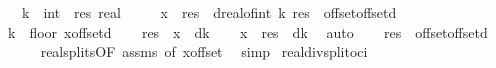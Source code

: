 \begin{isabellebody}
\ \ \ k\ {\isacharcolon}{\kern0pt}{\isacharcolon}{\kern0pt}\ int\ \ res\ {\isacharcolon}{\kern0pt}{\isacharcolon}{\kern0pt}real\ \isanewline
\ \ \ \ {\isachardoublequoteopen}x\ {\isacharequal}{\kern0pt}\ res\ {\isacharplus}{\kern0pt}\ d{\isacharasterisk}{\kern0pt}real{\isacharunderscore}{\kern0pt}of{\isacharunderscore}{\kern0pt}int\ k{\isachardoublequoteclose}\ {\isachardoublequoteopen}res\ {\isasymin}\ {\isacharbraceleft}{\kern0pt}offset{\isachardot}{\kern0pt}{\isachardot}{\kern0pt}{\isacharless}{\kern0pt}offset{\isacharplus}{\kern0pt}d{\isacharbraceright}{\kern0pt}{\isachardoublequoteclose}\isanewline
%
\isadelimproof
%
\endisadelimproof
%
\isatagproof
{}\isamarkupfalse%
\isanewline
\ \ \isamarkupfalse%
\ {\isacharquery}{\kern0pt}k\ {\isacharequal}{\kern0pt}\ {\isachardoublequoteopen}floor\ {\isacharparenleft}{\kern0pt}{\isacharparenleft}{\kern0pt}x{\isacharminus}{\kern0pt}offset{\isacharparenright}{\kern0pt}{\isacharslash}{\kern0pt}d{\isacharparenright}{\kern0pt}{\isachardoublequoteclose}\isanewline
\ \ \isamarkupfalse%
\ {\isacharquery}{\kern0pt}res\ {\isacharequal}{\kern0pt}\ {\isachardoublequoteopen}x\ {\isacharminus}{\kern0pt}\ d{\isacharasterisk}{\kern0pt}{\isacharquery}{\kern0pt}k{\isachardoublequoteclose}\isanewline
\ \ \isamarkupfalse%
\ {\isachardoublequoteopen}x\ {\isacharequal}{\kern0pt}\ {\isacharquery}{\kern0pt}res\ {\isacharplus}{\kern0pt}\ d{\isacharasterisk}{\kern0pt}{\isacharquery}{\kern0pt}k{\isachardoublequoteclose}\ \isamarkupfalse%
\ auto\isanewline
\ \ \isamarkupfalse%
\ {\isachardoublequoteopen}{\isacharquery}{\kern0pt}res\ {\isasymin}\ {\isacharbraceleft}{\kern0pt}offset{\isachardot}{\kern0pt}{\isachardot}{\kern0pt}{\isacharless}{\kern0pt}offset{\isacharplus}{\kern0pt}d{\isacharbraceright}{\kern0pt}{\isachardoublequoteclose}\isanewline
\ \ \ \ \isamarkupfalse%
\ real{\isacharunderscore}{\kern0pt}splits{\isacharbrackleft}{\kern0pt}OF\ assms{\isacharcomma}{\kern0pt}\ of\ {\isachardoublequoteopen}x{\isacharminus}{\kern0pt}offset{\isachardoublequoteclose}{\isacharbrackright}{\kern0pt}\ \isamarkupfalse%
\ simp\isanewline
{}\isamarkupfalse%
%
\endisatagproof
{\isafoldproof}%
%
\isadelimproof
\isanewline
%
\endisadelimproof
\isanewline
{}\isamarkupfalse%
\ real{\isacharunderscore}{\kern0pt}div{\isacharunderscore}{\kern0pt}split{\isacharunderscore}{\kern0pt}oci{\isacharcolon}{\kern0pt}\isanewline

\end{isabellebody}
